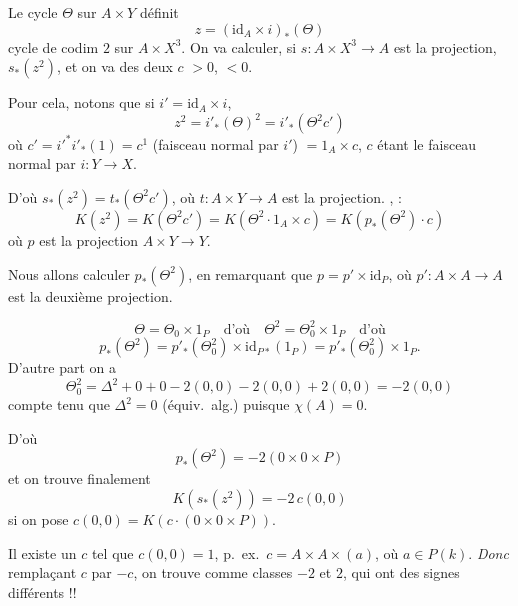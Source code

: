 \documentclass[11pt,a4paper]{article}
\begin{document}
Le cycle $\Theta$ sur $A \times Y$ définit
\[
  z = (\mathrm{id}_{A} \times i)_{*}(\Theta)
\]
cycle de codim $2$ sur $A \times X^{3}$. On va calculer, si
$s : A \times X^{3} \to A$ est la projection, $s_{*}(z^{2})$, et on va
 \ill{} des deux \ill{} \ill{} $c$ \ill{} $> 0$,
\ill{} $< 0$.

Pour cela, notons que si $i' = \mathrm{id}_{A} \times i$,
\[
  z^{2} = i'_{*}(\Theta)^{2} = i'_{*}(\Theta^{2} c')
\]
où $c' = i'^{*} i'_{*}(1) = c^{1}$ (faisceau normal par $i'$)
$= 1_{A} \times c$, $c$ étant le faisceau normal par $i : Y \to X$.



D'où $s_{*}(z^{2}) = t_{*}(\Theta^{2} c')$, où $t : A \times Y \to A$ est la
projection. \ill{} \ill{}, \ill{} \ill{} :
\[
  K(z^{2}) = K(\Theta^{2} c') = K(\Theta^{2} \cdot 1_{A} \times c)
  = K(p_{*}(\Theta^{2}) \cdot c)
\]
où $p$ est la projection $A \times Y \to Y$.

Nous allons calculer $p_{*}(\Theta^{2})$, en remarquant que
$p = p' \times \mathrm{id}_{P}$, où $p' : A \times A \to A$ est la deuxième
projection.


\[
  \Theta = \Theta_{0} \times 1_{P} \quad \text{d'où} \quad
  \Theta^{2} = \Theta_{0}^{2} \times 1_{P} \quad \text{d'où}
\]
\[
  p_{*}(\Theta^{2}) = p'_{*}(\Theta_{0}^{2}) \times
  \mathrm{id}_{P*}(1_{P}) = p'_{*}(\Theta_{0}^{2}) \times 1_{P} .
\]
D'autre part on a
\[
  \Theta_{0}^{2} = \Delta^{2} + 0 + 0 - 2(0,0) - 2(0,0) + 2(0,0)
  = -2(0,0)
\]
compte tenu que $\Delta^{2} = 0$ (équiv.\ alg.) puisque $\chi(A) = 0$.

D'où
\[
  p_{*}(\Theta^{2}) = -2(0 \times 0 \times P)
\]
et on trouve finalement
\[
  K(s_{*}(z^{2})) = -2\, c(0,0)
\]
si on pose $c(0,0) = K(c \cdot (0 \times 0 \times P))$.

Il existe un $c$ tel que $c(0,0) = 1$, p.\ ex.\
$c = A \times A \times (a)$, où $a \in P(k)$. \emph{Donc} remplaçant $c$
par $-c$, on trouve comme classes \uncertain{numériquement} $-2$ et $2$, qui
ont des signes différents !!
\end{document}
